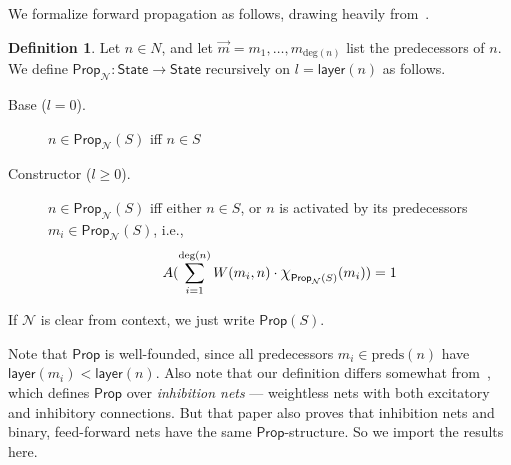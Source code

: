 \documentclass[letterpaper]{article}
\theoremstyle{definition}
\newtheorem{definition}{Definition}
\newcommand{\State}{\mathsf{State}}
\newcommand*{\bigchi}{\mbox{\Large$\chi$}}%
\newcommand{\degree}[1]{\mathrm{deg}(#1)}
\newcommand{\preds}[1]{\mbox{preds}(#1)}
\newcommand{\layer}[1]{\mathsf{layer}(#1)}
\newcommand{\Net}{\mathcal{N}}
\newcommand{\Prop}{\mathsf{Prop}}
\begin{document}
We formalize forward propagation as follows, drawing heavily from~\cite{leitgeb2001nonmonotonic}.
\begin{definition}
    Let $n \in N$, and let $\vec{m} = m_1, \ldots, m_{\degree{n}}$ list the predecessors of $n$.  We define $\Prop_\Net : \State \to \State$ recursively on $l = \layer{n}$ as follows.
    \begin{description}
        \item[Base ($l=0$).] $n \in \Prop_\Net(S)$ iff $n \in S$
        \item[Constructor ($l\geq0$).] $n \in \Prop_\Net(S)$ iff either $n \in S$, or $n$ is activated by its predecessors $m_i \in \Prop_\Net(S)$, i.e.,
        \[
            A(\sum_{i=1}^{\degree{n}} W(m_i, n) \cdot \bigchi_{\Prop_\Net(S)}(m_i)) = 1
        \]
    \end{description}
    If $\Net$ is clear from context, we just write $\Prop(S)$.
\end{definition}
Note that $\Prop$ is well-founded, since all predecessors $m_i \in \preds{n}$ have $\layer{m_i} < \layer{n}$.  Also note that our definition differs somewhat from~\cite{leitgeb2001nonmonotonic}, which defines $\Prop$ over \emph{inhibition nets} --- weightless nets with both excitatory and inhibitory connections.  But that paper also proves that inhibition nets and binary, feed-forward nets have the same $\Prop$-structure.  So we import the results here.
\end{document}
